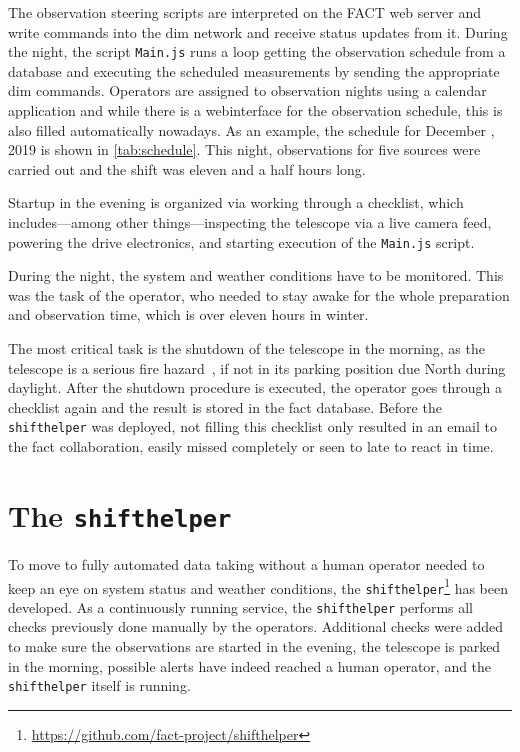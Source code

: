The observation steering scripts are interpreted on the FACT web server
and write commands into the \gls{dim} network and receive status updates from it.
During the night, the script \texttt{Main.js} runs a loop getting 
the observation schedule from a database and executing the scheduled measurements
by sending the appropriate \gls{dim} commands.
Operators are assigned to observation nights using a calendar application and
while there is a webinterface for the observation schedule,
this is also filled automatically nowadays.
As an example, the schedule for December , 2019 is shown in \autoref{tab:schedule}.
This night, observations for five sources were carried out and the shift was
eleven and a half hours long.

Startup in the evening is organized via working through a checklist, 
which includes—among other things—inspecting the telescope via a live camera feed,
powering the drive electronics,
and starting execution of the \texttt{Main.js} script.

During the night, the system and weather conditions have to be monitored.
This was the task of the operator, who needed to stay awake for the whole preparation and observation time, which is over eleven hours in winter.

The most critical task is the shutdown of the telescope in the morning,
as the telescope is a serious fire hazard~\cite{hegra-fire},
if not in its parking position due North during daylight.
After the shutdown procedure is executed, the operator goes through a checklist
again and the result is stored in the \gls{fact} database.
Before the \texttt{shifthelper} was deployed, not filling this checklist only
resulted in an email to the \gls{fact} collaboration,
easily missed completely or seen to late to react in time.

\section{The \texttt{shifthelper}}
To move to fully automated data taking without a human operator
needed to keep an eye on system status and weather conditions,
the \texttt{shifthelper}\footnote{\url{https://github.com/fact-project/shifthelper}} has been developed.
As a continuously running service,
the \texttt{shifthelper} performs all checks previously done manually by the operators.
Additional checks were added to make sure the observations are started in the 
evening, the telescope is parked in the morning,
possible alerts have indeed reached a human operator,
and the \texttt{shifthelper} itself is running.

